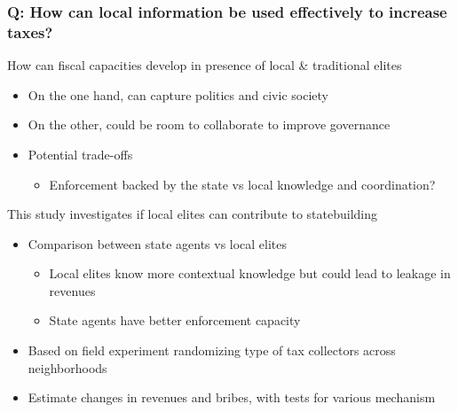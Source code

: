 \documentclass[aspectratio=169]{beamer}
\begin{document}
\begin{frame}
\frametitle{Q: How can local information be used effectively to increase taxes?} 
How can fiscal capacities develop in presence of local \& traditional elites
\begin{itemize}\setlength\itemsep{3pt}
\item On the one hand, can capture politics and civic society
\item On the other, could be room to collaborate to improve governance
\item Potential trade-offs
\begin{itemize}
\item Enforcement backed by the state vs local knowledge and coordination?
\end{itemize}
\end{itemize}\medskip
This study investigates if local elites can contribute to statebuilding
\begin{itemize}\setlength\itemsep{3pt}
\item Comparison between state agents vs local elites
\begin{itemize}\setlength\itemsep{3pt}
\item Local elites know more contextual knowledge but could lead to leakage in revenues
\item State agents have better enforcement capacity
\end{itemize}
\item Based on field experiment randomizing type of tax collectors across neighborhoods
\item Estimate changes in revenues and bribes, with tests for various mechanism
\end{itemize}
\end{frame}
\end{document}
